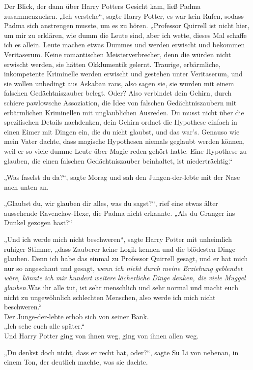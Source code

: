 {Der Blick, der dann über Harry Potters Gesicht kam, ließ Padma zusammenzucken. „Ich verstehe“, sagte Harry Potter, es war kein Rufen, sodass Padma sich anstrengen musste, um es zu hören. „Professor Quirrell ist nicht hier, um mir zu erklären, wie dumm die Leute sind, aber ich wette, dieses Mal schaffe ich es allein. Leute machen etwas Dummes und werden erwischt und bekommen Veritaserum. Keine romantischen Meisterverbrecher, denn die würden nicht erwischt werden, sie hätten Okklumentik gelernt. Traurige, erbärmliche, inkompetente Kriminelle werden erwischt und gestehen unter Veritaserum, und sie wollen unbedingt aus Askaban raus, also sagen sie, sie wurden mit einem falschen Gedächtniszauber belegt. Oder? Also verbindet dein Gehirn, durch schiere pawlowsche Assoziation, die Idee von falschen Gedächtniszaubern mit erbärmlichen Kriminellen mit unglaublichen Ausreden. Du musst nicht über die spezifischen Details nachdenken, dein Gehirn ordnet die Hypothese einfach in einen Eimer mit Dingen ein, die du nicht glaubst, und das war's. Genauso wie mein Vater dachte, dass magische Hypothesen niemals geglaubt werden können, weil er so viele dumme Leute über Magie reden gehört hatte. Eine Hypothese zu glauben, die einen falschen Gedächtniszauber beinhaltet, ist niederträchtig.“

„Was faselst du da?“, sagte Morag und sah den Jungen-der-lebte mit der Nase nach unten an.

„Glaubst du, wir glauben dir alles, was du sagst?“, rief eine etwas älter aussehende Ravenclaw-Hexe, die Padma nicht erkannte. „Als du Granger ins Dunkel gezogen hast?“

„Und ich werde mich nicht beschweren“, sagte Harry Potter mit unheimlich ruhiger Stimme, „dass Zauberer keine Logik kennen und die blödesten Dinge glauben. Denn ich habe das einmal zu Professor Quirrell gesagt, und er hat mich nur so angeschaut und gesagt, \emph{wenn ich nicht durch meine Erziehung geblendet wäre, könnte ich mir hundert weitere lächerliche Dinge denken, die viele Muggel glauben.}Was ihr alle tut, ist sehr menschlich und sehr normal und macht euch nicht zu ungewöhnlich schlechten Menschen, also werde ich mich nicht beschweren.“\\ Der Junge-der-lebte erhob sich von seiner Bank.\\ „Ich sehe euch alle später.“\\ Und Harry Potter ging von ihnen weg, ging von ihnen allen weg.

„Du denkst doch nicht, dass er recht hat, oder?“, sagte Su Li von nebenan, in einem Ton, der deutlich machte, was sie dachte.

}
